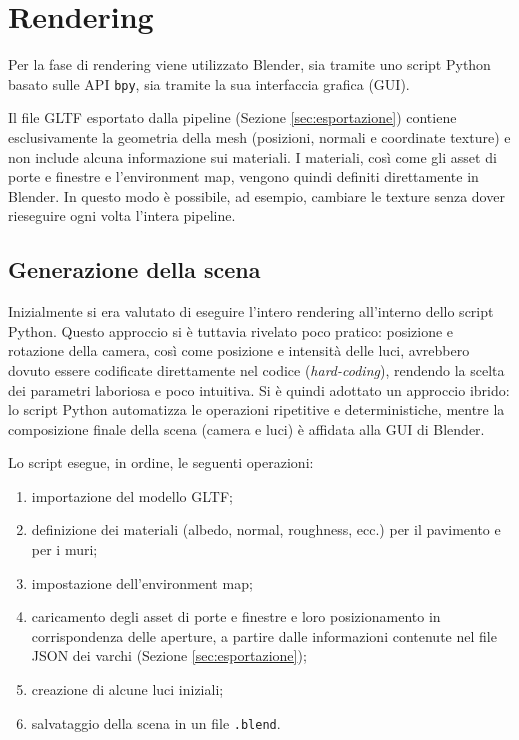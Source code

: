 \chapter{Rendering}
\label{ch:rendering}

Per la fase di rendering viene utilizzato Blender, sia tramite uno script Python basato sulle API \texttt{bpy}, sia tramite la sua interfaccia grafica (GUI).

Il file GLTF esportato dalla pipeline (Sezione \ref{sec:esportazione}) contiene esclusivamente la geometria della mesh (posizioni, normali e coordinate texture) e non include alcuna informazione sui materiali. I materiali, così come gli asset di porte e finestre e l'environment map, vengono quindi definiti direttamente in Blender. In questo modo è possibile, ad esempio, cambiare le texture senza dover rieseguire ogni volta l'intera pipeline.

\section{Generazione della scena}
\label{sec:generazione_scena_blender}

Inizialmente si era valutato di eseguire l'intero rendering all'interno dello script Python. Questo approccio si è tuttavia rivelato poco pratico: posizione e rotazione della camera, così come posizione e intensità delle luci, avrebbero dovuto essere codificate direttamente nel codice (\emph{hard-coding}), rendendo la scelta dei parametri laboriosa e poco intuitiva. Si è quindi adottato un approccio ibrido: lo script Python automatizza le operazioni ripetitive e deterministiche, mentre la composizione finale della scena (camera e luci) è affidata alla GUI di Blender.

Lo script esegue, in ordine, le seguenti operazioni:

\begin{enumerate}
	\item importazione del modello GLTF;
	\item definizione dei materiali (albedo, normal, roughness, ecc.) per il pavimento e per i muri;
	\item impostazione dell'environment map;
	\item caricamento degli asset di porte e finestre e loro posizionamento in corrispondenza delle aperture, a partire dalle informazioni contenute nel file JSON dei varchi (Sezione \ref{sec:esportazione});
	\item creazione di alcune luci iniziali;
	\item salvataggio della scena in un file \texttt{.blend}.
\end{enumerate}

